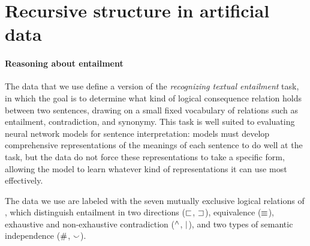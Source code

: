 \section{Recursive structure in artificial data}\label{sec:recursion}
\paragraph{Reasoning about entailment} 
The data that we use define a version of the \emph{recognizing textual entailment} task, in which the goal is to determine what kind of logical consequence relation holds between two sentences, drawing on a small fixed vocabulary of relations such as entailment, contradiction, and synonymy. This task is well suited to evaluating neural network models for sentence interpretation: models must develop comprehensive representations of the meanings of each sentence to do well at the task, but the data do not force these representations to take a specific form, allowing the model to learn whatever kind of representations it can use most effectively.

The data we use are labeled with the seven mutually exclusive logical relations of , which distinguish entailment in two directions ($\sqsubset$, $\sqsupset$), equivalence ($\equiv$), exhaustive and non-exhaustive contradiction ($\mathbin{^{\wedge}}$, $\mathbin{|}$), and two types of semantic independence ($\mathbin{\#}$, $\mathbin{\smallsmile}$).


